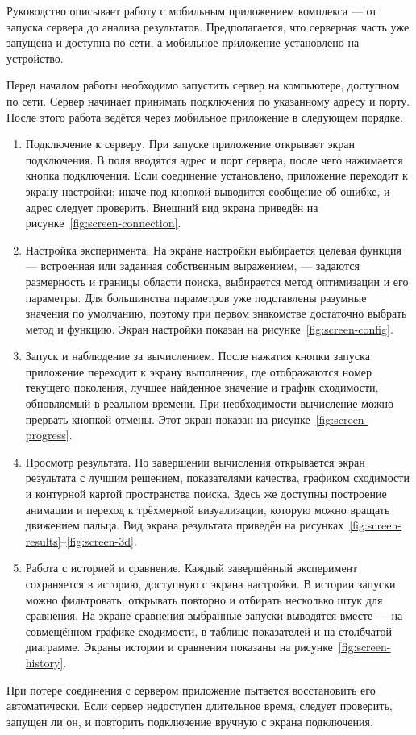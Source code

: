 \documentclass[14pt, a4paper]{extarticle}
\begin{document}
Руководство описывает работу с мобильным приложением комплекса --- от запуска
сервера до анализа результатов. Предполагается, что серверная часть уже запущена
и доступна по сети, а мобильное приложение установлено на устройство.

Перед началом работы необходимо запустить сервер на компьютере, доступном по сети.
Сервер начинает принимать подключения по указанному адресу и порту. После этого
работа ведётся через мобильное приложение в следующем порядке.

\begin{enumerate}
  \item Подключение к серверу. При запуске приложение открывает экран подключения.
  В поля вводятся адрес и порт сервера, после чего нажимается кнопка подключения.
  Если соединение установлено, приложение переходит к экрану настройки; иначе под
  кнопкой выводится сообщение об ошибке, и адрес следует проверить. Внешний вид
  экрана приведён на рисунке~\ref{fig:screen-connection}.

  \item Настройка эксперимента. На экране настройки выбирается целевая функция ---
  встроенная или заданная собственным выражением, --- задаются размерность и
  границы области поиска, выбирается метод оптимизации и его параметры. Для
  большинства параметров уже подставлены разумные значения по умолчанию, поэтому
  при первом знакомстве достаточно выбрать метод и функцию. Экран настройки
  показан на рисунке~\ref{fig:screen-config}.

  \item Запуск и наблюдение за вычислением. После нажатия кнопки запуска приложение
  переходит к экрану выполнения, где отображаются номер текущего поколения, лучшее
  найденное значение и график сходимости, обновляемый в реальном времени. При
  необходимости вычисление можно прервать кнопкой отмены. Этот экран показан на
  рисунке~\ref{fig:screen-progress}.

  \item Просмотр результата. По завершении вычисления открывается экран результата
  с лучшим решением, показателями качества, графиком сходимости и контурной картой
  пространства поиска. Здесь же доступны построение анимации и переход к
  трёхмерной визуализации, которую можно вращать движением пальца. Вид экрана
  результата приведён на рисунках~\ref{fig:screen-results}--\ref{fig:screen-3d}.

  \item Работа с историей и сравнение. Каждый завершённый эксперимент сохраняется
  в историю, доступную с экрана настройки. В истории запуски можно фильтровать,
  открывать повторно и отбирать несколько штук для сравнения. На экране сравнения
  выбранные запуски выводятся вместе --- на совмещённом графике сходимости, в
  таблице показателей и на столбчатой диаграмме. Экраны истории и сравнения
  показаны на рисунке~\ref{fig:screen-history}.
\end{enumerate}

При потере соединения с сервером приложение пытается восстановить его
автоматически. Если сервер недоступен длительное время, следует проверить, запущен
ли он, и повторить подключение вручную с экрана подключения.
\end{document}
